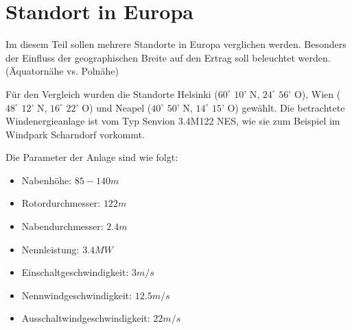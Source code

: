 \documentclass[a4paper,12pt]{article}
\begin{document}
	\section{Standort in Europa}
	Im diesem Teil sollen mehrere Standorte in Europa verglichen werden. Besonders der Einfluss der geographischen Breite auf den Ertrag soll beleuchtet werden. (Äquatornähe vs. Polnähe)\\ \par
	\noindent Für den Vergleich wurden die Standorte Helsinki ($60^{\circ}$ $10$' N, $24^{\circ}$ $56$' O), Wien ($48^{\circ}$ $12$' N, $16^{\circ}$ $22$' O) und Neapel ($40^{\circ}$ $50$' N, $14^{\circ}$ $15$' O) gewählt.\newline
	Die betrachtete Windenergieanlage ist vom Typ Senvion 3.4M122 NES, wie sie zum Beispiel im Windpark Scharndorf vorkommt.\\ \par
	\noindent Die Parameter der Anlage sind wie folgt:
	\begin{itemize}
		\item Nabenhöhe: $85 - 140m$
		\item Rotordurchmesser: $122m$
		\item Nabendurchmesser: $2.4m$
		\item Nennleistung: $3.4MW$
		\item Einschaltgeschwindigkeit: $3m/s$
		\item Nennwindgeschwindigkeit: $12.5m/s$
		\item Ausschaltwindgeschwindigkeit: $22m/s$
	\end{itemize}
\end{document}
